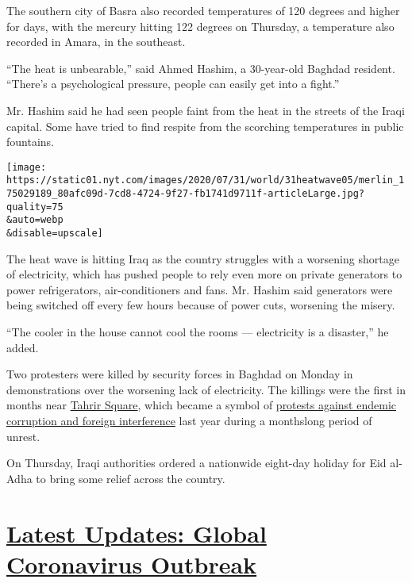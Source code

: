 The southern city of Basra also recorded temperatures of 120 degrees and
higher for days, with the mercury hitting 122 degrees on Thursday, a
temperature also recorded in Amara, in the southeast.

``The heat is unbearable,'' said Ahmed Hashim, a 30-year-old Baghdad
resident. ``There's a psychological pressure, people can easily get into
a fight.''

Mr. Hashim said he had seen people faint from the heat in the streets of
the Iraqi capital. Some have tried to find respite from the scorching
temperatures in public fountains.

\texttt{[image: https://static01.nyt.com/images/2020/07/31/world/31heatwave05/merlin\_175029189\_80afc09d-7cd8-4724-9f27-fb1741d9711f-articleLarge.jpg?quality=75\\\&auto=webp\\\&disable=upscale]}

The heat wave is hitting Iraq as the country struggles with a worsening
shortage of electricity, which has pushed people to rely even more on
private generators to power refrigerators, air-conditioners and fans.
Mr. Hashim said generators were being switched off every few hours
because of power cuts, worsening the misery.

``The cooler in the house cannot cool the rooms --- electricity is a
disaster,'' he added.

Two protesters were killed by security forces in Baghdad on Monday in
demonstrations over the worsening lack of electricity. The killings were
the first in months near
\href{https://www.nytimes.com/2019/11/20/world/middleeast/iraq-protests-sadr-city.html}{Tahrir
Square}, which became a symbol of
\href{https://www.nytimes.com/2019/12/21/world/middleeast/Iraq-protests-Iran.html}{protests
against endemic corruption and foreign interference} last year during a
monthslong period of unrest.

On Thursday, Iraqi authorities ordered a nationwide eight-day holiday
for Eid al-Adha to bring some relief across the country.

\hypertarget{latest-updates-global-coronavirus-outbreak}{%
\section{\texorpdfstring{\href{https://www.nytimes.com/2020/08/04/world/coronavirus-cases.html?action=click\&pgtype=Article\&state=default\&region=MAIN_CONTENT_1\&context=storylines_live_updates}{Latest
Updates: Global Coronavirus
Outbreak}}{Latest Updates: Global Coronavirus Outbreak}}\label{latest-updates-global-coronavirus-outbreak}}

